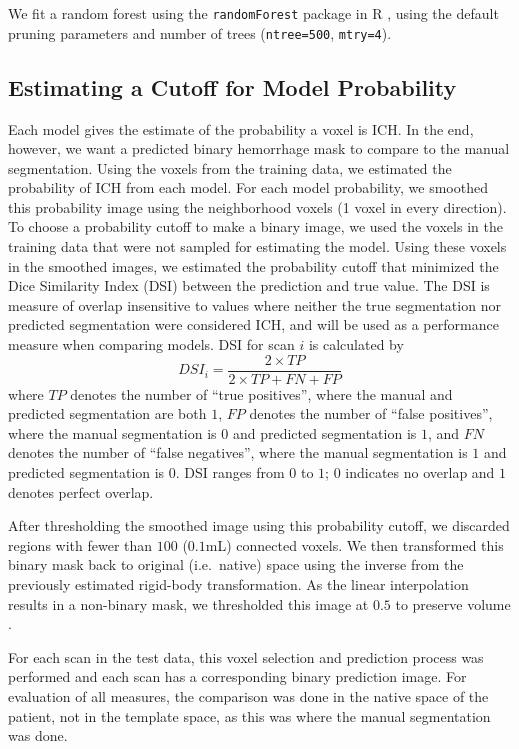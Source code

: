 \documentclass{elsarticle_nonatbib}\usepackage[]{graphicx}\usepackage[]{color}
\newcommand{\pkg}[1]{\texttt{#1}}
\newcommand{\code}[1]{\texttt{#1}}
\begin{document}
We fit a random forest \citep{breiman2001random} using the \pkg{randomForest} package in R \citep{randomForest}, using the default pruning parameters and number of trees (\code{ntree=500}, \code{mtry=4}). 



\subsection{Estimating a Cutoff for Model Probability}

Each model gives the estimate of the probability a voxel is ICH.  In the end, however, we want a predicted binary hemorrhage mask to compare to the manual segmentation. 
Using the voxels from the training data, we estimated the probability of ICH from each model.  For each model probability, we smoothed this probability image using the neighborhood voxels (1 voxel in every direction).  To choose a probability cutoff to make a binary image, we used the voxels in the training data that were not sampled for estimating the model.  Using these voxels in the smoothed images, we estimated the probability cutoff that minimized the Dice Similarity Index (DSI) \citep{dice_measures_1945} between the prediction and true value.  
 The DSI is measure of overlap insensitive to values where neither the true segmentation nor predicted segmentation were considered ICH, and will be used as a performance measure when comparing models.  DSI for scan $i$ is calculated by 
 $$
 DSI_i = \frac{2 \times TP}{2\times TP + FN + FP}
 $$
 where $TP$ denotes the number of ``true positives'', where the manual and predicted segmentation are both $1$, $FP$ denotes the number of ``false positives'', where the manual segmentation is $0$ and predicted segmentation is $1$, and $FN$ denotes the number of ``false negatives'', where the manual segmentation is $1$ and predicted segmentation is $0$.  DSI ranges from $0$ to $1$; $0$ indicates no overlap and $1$ denotes perfect overlap.

After thresholding the smoothed image using this probability cutoff, we discarded regions with fewer than $100$ ($0.1$mL) connected voxels.  We then transformed this binary mask back to original (i.e.~native) space using the inverse from the previously estimated rigid-body transformation.  As the linear interpolation results in a non-binary mask, we thresholded this image at $0.5$ to preserve volume \cite{flirt_reg}.  

For each scan in the test data, this voxel selection and prediction process was performed and each scan has a corresponding binary prediction  image.  For evaluation of all measures, the comparison was done in the native space of the patient, not in the template space, as this was where the manual segmentation was done.
\end{document}
